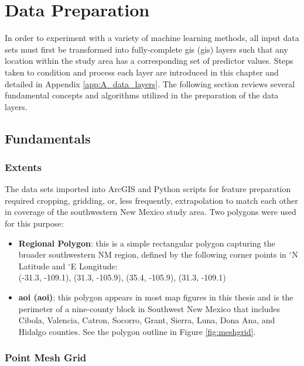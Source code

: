 \section{Data Preparation}\label{ch3:data_prep}
In order to experiment with a variety of machine learning methods, all input data sets must first be transformed into fully-complete \acrlong{gis} (\acrshort{gis}) layers such that any location within the study area has a corresponding set of predictor values. Steps taken to condition and process each layer are introduced in this chapter and detailed in Appendix \ref{app:A_data_layers}. The following section reviews several fundamental concepts and algorithms utilized in the preparation of the data layers.

\subsection{Fundamentals}\label{ch3:data_prep_fundamentals}
\subsubsection{Extents}\label{ch3:extents}
The data sets imported into ArcGIS and Python scripts for feature preparation required cropping, gridding, or, less frequently, extrapolation to match each other in coverage of the southwestern New Mexico study area. Two polygons were used for this purpose:

\begin{itemize}
\item \textbf{Regional Polygon}: this is a simple rectangular polygon capturing the broader southwestern NM region, defined by the following corner points in $^\circ$N Latitude and $^\circ$E Longitude: \\ (-31.3, -109.1), (31.3, -105.9), (35.4, -105.9), (31.3, -109.1)
\item \textbf{\acrlong{aoi} (\acrshort{aoi})}: this polygon appears in most map figures in this thesis and is the perimeter of a nine-county block in Southwest New Mexico that includes Cibola, Valencia, Catron, Socorro, Grant, Sierra, Luna, Dona Ana, and Hidalgo counties. See the polygon outline in Figure \ref{fig:meshgrid}.
\end{itemize}

\subsubsection{Point Mesh Grid}
\label{ch3:meshgrid}


